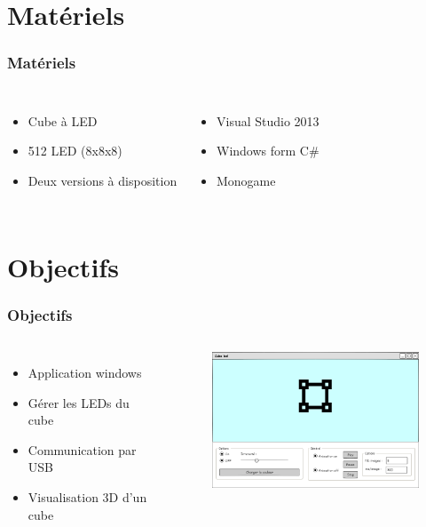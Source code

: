 \documentclass[aspectratio=169]{beamer} %
\begin{document}
	
	\section{Matériels}
	\begin{frame}
		\frametitle{Matériels}
		\begin{columns}[c]
			\begin{itemize}
				\item Cube à LED
				\item 512 LED (8x8x8)
				\item Deux versions à disposition
			\end{itemize}
			
			\begin{itemize}
				\item Visual Studio 2013
				\item Windows form C\#
				\item Monogame
			\end{itemize}
			
			
		\end{columns}
	\end{frame}
	
	\section{Objectifs}
	\begin{frame}
		\frametitle{Objectifs}
		\begin{columns}[c]
			\column{.45\textwidth}
			\begin{itemize}
				\item Application windows
				\item Gérer les LEDs du cube
				\item Communication par USB
 				\item Visualisation 3D d'un cube
			\end{itemize}
			
			\column{.55\textwidth}
			\begin{figure}
				\centering
				\includegraphics[width=7cm]{Img/windform.png}
			\end{figure}
		\end{columns}
	\end{frame}
	
\end{document}
